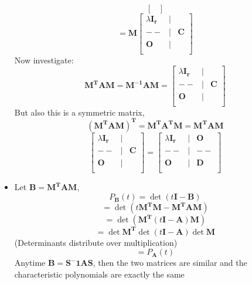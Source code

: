 \documentclass[10pt, oneside]{article}
\newcommand{\mat}[1]{\mathbf{#1}}
\begin{document}
\begin{itemize}
\[\begin{bmatrix}
            \end{bmatrix}\]
            \[= \mat{M} \begin{bmatrix}
                \lambda \mat{I_r} & | & \\
                -- & | & \mat{C}\\
                \mat{O} & | &  \\
            \end{bmatrix}\]
        Now investigate:
            \[\mat{M^T}\mat{A}\mat{M} = \mat{M^{-1}}\mat{A}\mat{M} = 
            \begin{bmatrix}
                \lambda \mat{I_r} & | & \\
                -- & | & \mat{C}\\
                \mat{O} & | &  \\
            \end{bmatrix}\]
        But also this is a symmetric matrix,
            \[(\mat{M^T}\mat{A}\mat{M})^\mat{T} = \mat{M^T}\mat{A^T}\mat{M} = \mat{M^T}\mat{A}\mat{M}\]
            \[ \begin{bmatrix}
                \lambda \mat{I_r} & | & \\
                -- & | & \mat{C}\\
                \mat{O} & | &  \\
            \end{bmatrix} = 
            \begin{bmatrix}
                \lambda \mat{I_r} & | & \mat{O} \\
                -- & | & -- \\
                \mat{O} & | & \mat{D} \\
            \end{bmatrix}\]
    \item Let $\mat{B} = \mat{M^T}\mat{A}\mat{M}$,
            \[P_\mat{B} (t) = \det(t\mat{I} - \mat{B})\]
            \[= \det(t \mat{M^T}\mat{M} - \mat{M^T}\mat{A}\mat{M})\]
            \[= \det(\mat{M^T} (t\mat{I} - \mat{A}) \mat{M})\]
            \[= \det \mat{M^T} \det (t\mat{I} - \mat{A}) \det    \mat{M}\]
        (Determinants distribute over multiplication)
            \[= P_\mat{A} (t)\]
        Anytime $\mat{B} = \mat{S^-1}\mat{A}\mat{S}$, then the two matrices are similar and the characteristic polynomials are exactly the same
\end{itemize}
\end{document}
